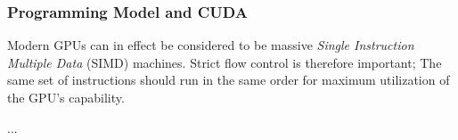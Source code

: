 \subsubsection{Programming Model and CUDA} \label{background:graphical_processing_units:programming_model_and_cuda}

Modern GPUs can in effect be considered to be massive \textit{Single Instruction Multiple Data} (SIMD) machines. Strict flow control is therefore important; The same set of instructions should run in the same order for maximum utilization of the GPU's capability.

...


